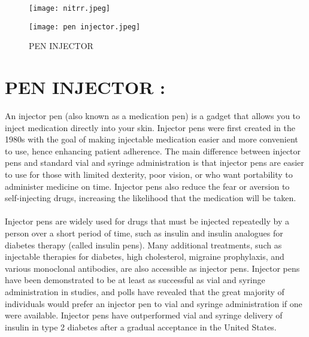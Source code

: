 \documentclass[a4paper,12pt]{article}
\author{Piyush Bisen \\ Roll no- 21111036}
\begin{document}
\begin{figure}
\centering
\texttt{[image: nitrr.jpeg]}
\end{figure}



\maketitle

\clearpage

\tableofcontents
\clearpage
\large
\begin{figure}
\centering
\texttt{[image: pen injector.jpeg]}
\caption{PEN INJECTOR}
\end{figure}
\section{PEN INJECTOR :}

 \medspace
 
  An injector pen (also known as a medication pen) is a gadget that allows you to inject medication directly into your skin. Injector pens were first created in the 1980s with the goal of making injectable medication easier and more convenient to use, hence enhancing patient adherence. The main difference between injector pens and standard vial and syringe administration is that injector pens are easier to use for those with limited dexterity, poor vision, or who want portability to administer medicine on time. Injector pens also reduce the fear or aversion to self-injecting drugs, increasing the likelihood that the medication will be taken.
 \\
 \\

 Injector pens are widely used for drugs that must be injected repeatedly by a person over a short period of time, such as insulin and insulin analogues for diabetes therapy (called insulin pens). Many additional treatments, such as injectable therapies for diabetes, high cholesterol, migraine prophylaxis, and various monoclonal antibodies, are also accessible as injector pens. Injector pens have been demonstrated to be at least as successful as vial and syringe administration in studies, and polls have revealed that the great majority of individuals would prefer an injector pen to vial and syringe administration if one were available. Injector pens have outperformed vial and syringe delivery of insulin in type 2 diabetes after a gradual acceptance in the United States.
 \\
  \clearpage
\end{document}
